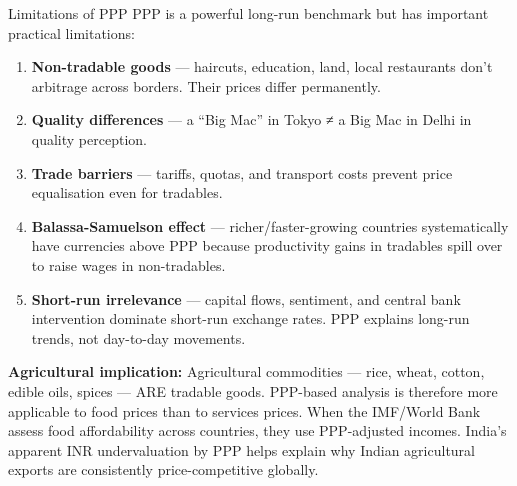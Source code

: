 \documentclass[
  ignorenonframetext,
  aspectratio=169,
]{beamer}
\makeatletter
\providecommand{\tightlist}{%
  \setlength{\itemsep}{0pt}\setlength{\parskip}{0pt}}
\let\quarto@originallabel\label
\DeclareRobustCommand*{\label}[1]{\quarto@originallabel{#1}}
\makeatother
\begin{document}
\begin{frame}{Limitations of PPP}
\label{limitations-of-ppp}
PPP is a powerful long-run benchmark but has important practical
limitations:

\begin{enumerate}
\tightlist
\item
  \textbf{Non-tradable goods} --- haircuts, education, land, local
  restaurants don't arbitrage across borders. Their prices differ
  permanently.
\item
  \textbf{Quality differences} --- a ``Big Mac'' in Tokyo ≠ a Big Mac in
  Delhi in quality perception.
\item
  \textbf{Trade barriers} --- tariffs, quotas, and transport costs
  prevent price equalisation even for tradables.
\item
  \textbf{Balassa-Samuelson effect} --- richer/faster-growing countries
  systematically have currencies above PPP because productivity gains in
  tradables spill over to raise wages in non-tradables.
\item
  \textbf{Short-run irrelevance} --- capital flows, sentiment, and
  central bank intervention dominate short-run exchange rates. PPP
  explains long-run trends, not day-to-day movements.
\end{enumerate}

\textbf{Agricultural implication:} Agricultural commodities --- rice,
wheat, cotton, edible oils, spices --- ARE tradable goods. PPP-based
analysis is therefore more applicable to food prices than to services
prices. When the IMF/World Bank assess food affordability across
countries, they use PPP-adjusted incomes. India's apparent INR
undervaluation by PPP helps explain why Indian agricultural exports are
consistently price-competitive globally.
\end{frame}
\end{document}
